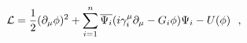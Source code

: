 \begin{equation}
{\cal L}=\frac{1}{2}(\partial_{\mu}\phi)^2 
	+\sum_{i=1}^{n}\overline{\Psi_i}
	(i\gamma_i^{\mu}\partial_{\mu}-G_i\phi)\Psi_i -U(\phi)~~,
\label{L.eqn2}
\end{equation}

